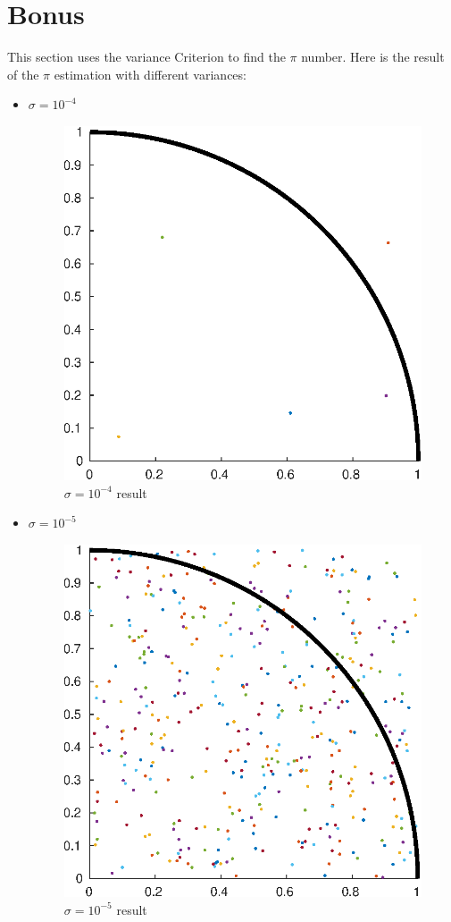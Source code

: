 \section{Bonus}
This section uses the variance Criterion to find the $\pi$ number. Here is the result of the $\pi$ estimation with different variances:
\begin{itemize}
    \item $\sigma = 10^{-4}$
    \begin{figure}[H] 
     	\caption{$\sigma = 10^{-4}$ result} 
     	\centering 
     	\includegraphics[width=12cm]{../Figure/Bonus/mont_e4} 
    \end{figure}
    \item $\sigma = 10^{-5}$
    \begin{figure}[H] 
        \caption{$\sigma = 10^{-5}$ result} 
        \centering 
        \includegraphics[width=12cm]{../Figure/Bonus/mont1e-05.eps} 

\end{figure}
\end{itemize}
